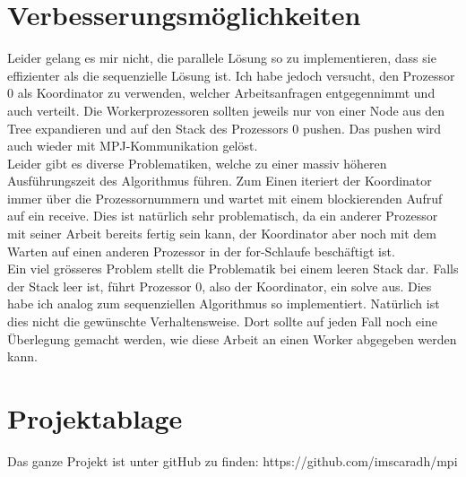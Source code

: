 \documentclass[10pt]{article}         %
\begin{document}
\section{Verbesserungsmöglichkeiten}
Leider gelang es mir nicht, die parallele Lösung so zu implementieren, dass sie effizienter als die sequenzielle Lösung ist. Ich habe jedoch versucht, den Prozessor 0 als Koordinator zu verwenden, welcher Arbeitsanfragen entgegennimmt und auch verteilt. Die Workerprozessoren sollten jeweils nur von einer Node aus den Tree expandieren und auf den Stack des Prozessors 0 pushen. Das pushen wird auch wieder mit MPJ-Kommunikation gelöst. \\
Leider gibt es diverse Problematiken, welche zu einer massiv höheren Ausführungszeit des Algorithmus führen. Zum Einen iteriert der Koordinator immer über die Prozessornummern und wartet mit einem blockierenden Aufruf auf ein receive. Dies ist natürlich sehr problematisch, da ein anderer Prozessor mit seiner Arbeit bereits fertig sein kann, der Koordinator aber noch mit dem Warten auf einen anderen Prozessor in der for-Schlaufe beschäftigt ist. \\
Ein viel grösseres Problem stellt die Problematik bei einem leeren Stack dar. Falls der Stack leer ist, führt Prozessor 0, also der Koordinator, ein solve aus. Dies habe ich analog zum sequenziellen Algorithmus so implementiert. Natürlich ist dies nicht die gewünschte Verhaltensweise. Dort sollte auf jeden Fall noch eine Überlegung gemacht werden, wie diese Arbeit an einen Worker abgegeben werden kann. 

\section{Projektablage}
Das ganze Projekt ist unter gitHub zu finden: https://github.com/imscaradh/mpi
\end{document}
